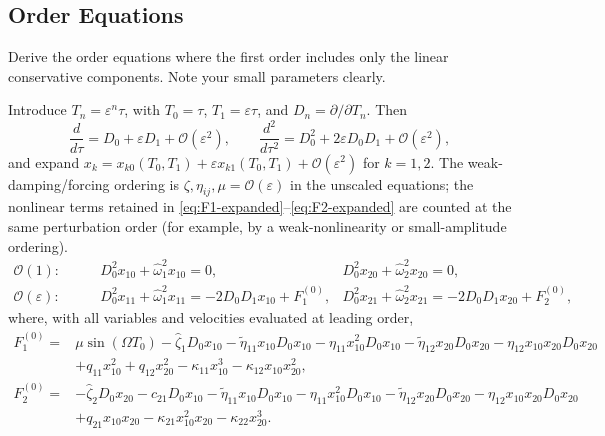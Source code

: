 \documentclass[11pt]{article}
\newenvironment{assignmentinstruction}{\par\begingroup\color{blue}}{\par\endgroup}
\begin{document}
\subsection{Order Equations}
\begin{assignmentinstruction}
Derive the order equations where the first order includes only the linear conservative components. Note your small parameters clearly.
\end{assignmentinstruction}
Introduce $T_n=\varepsilon^n\tau$, with $T_0=\tau$, $T_1=\varepsilon\tau$, and $D_n=\partial/\partial T_n$. Then
\[
\frac{d}{d\tau}=D_0+\varepsilon D_1+\mathcal{O}(\varepsilon^2),\qquad
\frac{d^2}{d\tau^2}=D_0^2+2\varepsilon D_0D_1+\mathcal{O}(\varepsilon^2),
\]
and expand $x_k=x_{k0}(T_0,T_1)+\varepsilon x_{k1}(T_0,T_1)+\mathcal{O}(\varepsilon^2)$ for $k=1,2$. The weak-damping/forcing ordering is $\zeta,\eta_{ij},\mu=\mathcal{O}(\varepsilon)$ in the unscaled equations; the nonlinear terms retained in \eqref{eq:F1-expanded}--\eqref{eq:F2-expanded} are counted at the same perturbation order (for example, by a weak-nonlinearity or small-amplitude ordering).
\begin{align}
\mathcal{O}(1):\qquad&D_0^2x_{10}+\hat{\omega}_1^2x_{10}=0,&
D_0^2x_{20}+\hat{\omega}_2^2x_{20}=0,\label{eq:order-zero}\\[2pt]
\mathcal{O}(\varepsilon):\qquad&D_0^2x_{11}+\hat{\omega}_1^2x_{11}=-2D_0D_1x_{10}+F_1^{(0)},&
D_0^2x_{21}+\hat{\omega}_2^2x_{21}=-2D_0D_1x_{20}+F_2^{(0)},\label{eq:order-one}
\end{align}
where, with all variables and velocities evaluated at leading order,
\begin{align*}
F_1^{(0)}={}&\mu\sin(\Omega T_0)-\hat{\zeta}_1D_0x_{10}-\tilde{\eta}_{11}x_{10}D_0x_{10}-\eta_{11}x_{10}^2D_0x_{10}-\tilde{\eta}_{12}x_{20}D_0x_{20}-\eta_{12}x_{10}x_{20}D_0x_{20}\\
&+q_{11}x_{10}^2+q_{12}x_{20}^2-\kappa_{11}x_{10}^3-\kappa_{12}x_{10}x_{20}^2,\\
F_2^{(0)}={}&-\hat{\zeta}_2D_0x_{20}-c_{21}D_0x_{10}-\tilde{\eta}_{11}x_{10}D_0x_{10}-\eta_{11}x_{10}^2D_0x_{10}-\tilde{\eta}_{12}x_{20}D_0x_{20}-\eta_{12}x_{10}x_{20}D_0x_{20}\\
&+q_{21}x_{10}x_{20}-\kappa_{21}x_{10}^2x_{20}-\kappa_{22}x_{20}^3.
\end{align*}
\end{document}
